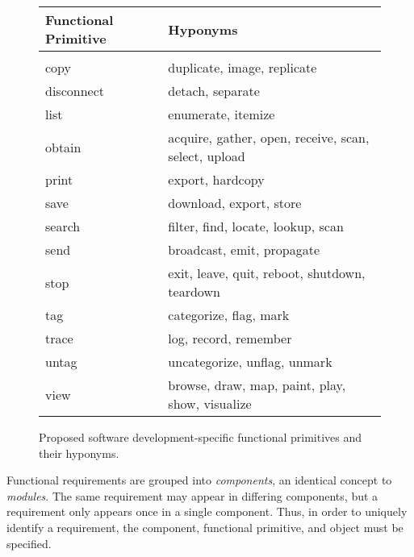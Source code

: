 \documentclass[letterpaper,10pt]{article}
\begin{document}
				\begin{figure}[ht]
                \begin{center}
                    \begin{tabular}{l|l}
                      Functional Primitive & Hyponyms\\
                      \hline\\
                      copy        & duplicate, image, replicate\\
                      disconnect  & detach, separate\\
                      list        & enumerate, itemize\\
                      obtain      & acquire, gather, open, receive, scan, select, upload\\
                      print       & export, hardcopy\\
                      save        & download, export, store\\
                      search      & filter, find, locate, lookup, scan\\
                      send        & broadcast, emit, propagate\\
                      stop        & exit, leave, quit, reboot, shutdown, teardown\\
                      tag         & categorize, flag, mark\\
                      trace       & log, record, remember\\
                      untag       & uncategorize, unflag, unmark\\
                      view        & browse, draw, map, paint, play, show, visualize
                    \end{tabular}
                    \caption{Proposed software development-specific functional primitives and their hyponyms.}
                    \label{table:software_func_prims}
                \end{center}
				\end{figure}

                Functional requirements are grouped into
                \textit{components}, an identical concept to
                \textit{modules}. The same requirement may appear in
                differing components, but a requirement only appears
                once in a single component. Thus, in order to uniquely
                identify a requirement, the component, functional
                primitive, and object must be specified.
\end{document}
